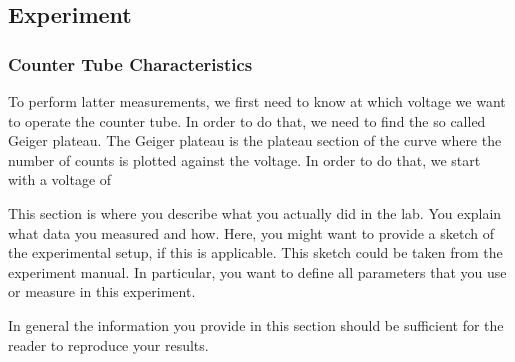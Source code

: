 \subsection{Experiment}


\subsubsection{Counter Tube Characteristics}
To perform latter measurements, we first need to know at which voltage we want to operate the counter tube.
In order to do that, we need to find the so called Geiger plateau.
The Geiger plateau is the plateau section of the curve where the number of counts is plotted against the voltage.
In order to do that, we start with a voltage of 

This section is where you describe what you actually did in the lab.
You explain what data you measured and how. Here, you might want to
provide a sketch of the experimental setup, if this is applicable.
This sketch could be taken from the experiment manual. In particular,
you want to define all parameters that you use or measure in this
experiment.

In general the information you provide in this section should be
sufficient for the reader to reproduce your results.